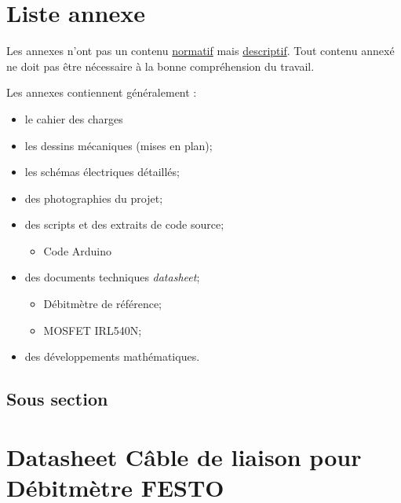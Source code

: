 \documentclass[
    iai & comatec, %
    mi, %
]{heig-tb}
\begin{document}
\clearpage

\printbibliography

\appendix
\appendixpage
\addappheadtotoc

\chapter{Liste annexe}

Les annexes n'ont pas un contenu \underline{normatif} mais \underline{descriptif}. Tout contenu annexé ne doit pas être nécessaire à la bonne compréhension du travail.

Les annexes contiennent généralement :

\begin{itemize}
    \item le cahier des charges
    \item les dessins mécaniques (mises en plan);
    \item les schémas électriques détaillés;
    \item des photographies du projet;
    \item des scripts et des extraits de code source;
          \begin{itemize}
              \item Code Arduino
          \end{itemize}
    \item des documents techniques \pex \emph{datasheet};
          \begin{itemize}
              \item Débitmètre de référence;
              \item MOSFET IRL540N;
          \end{itemize}
    \item des développements mathématiques.
\end{itemize}
\section{Sous section}
\lipsum[1]

\chapter{Datasheet Câble de liaison pour Débitmètre FESTO}


\let\cleardoublepage\clearpage
\backmatter

\label{index}
\printindex

%
\end{document}
